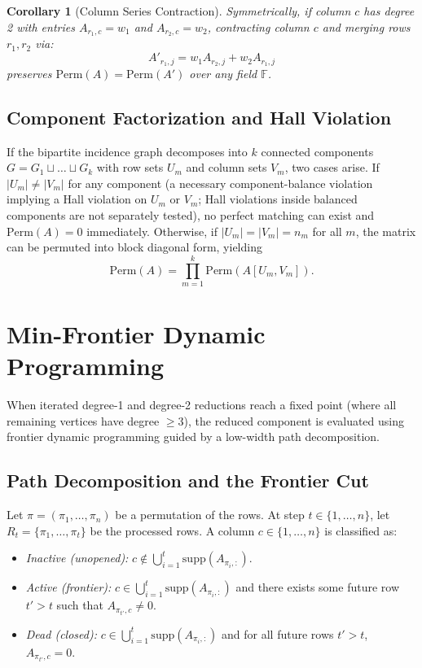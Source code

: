 \documentclass[11pt,a4paper]{article}
\newtheorem{corollary}[theorem]{Corollary}
\theoremstyle{definition}
\newcommand{\Perm}{\mathrm{Perm}}
\newcommand{\F}{\mathbb{F}}
\begin{document}
\begin{corollary}[Column Series Contraction]
Symmetrically, if column $c$ has degree 2 with entries $A_{r_1, c} = w_1$ and $A_{r_2, c} = w_2$, contracting column $c$ and merging rows $r_1, r_2$ via:
\begin{equation}
A'_{r_1, j} = w_1 A_{r_2, j} + w_2 A_{r_1, j}
\end{equation}
preserves $\Perm(A) = \Perm(A')$ over any field $\F$.
\end{corollary}

\subsection{Component Factorization and Hall Violation}

If the bipartite incidence graph decomposes into $k$ connected components $G = G_1 \sqcup \dots \sqcup G_k$ with row sets $U_m$ and column sets $V_m$, two cases arise. If $|U_m| \neq |V_m|$ for any component (a necessary component-balance violation implying a Hall violation on $U_m$ or $V_m$; Hall violations inside balanced components are not separately tested), no perfect matching can exist and $\Perm(A) = 0$ immediately. Otherwise, if $|U_m| = |V_m| = n_m$ for all $m$, the matrix can be permuted into block diagonal form, yielding
\begin{equation}
\Perm(A) = \prod_{m=1}^k \Perm(A[U_m, V_m]).
\end{equation}

\section{Min-Frontier Dynamic Programming}

When iterated degree-1 and degree-2 reductions reach a fixed point (where all remaining vertices have degree $\ge 3$), the reduced component is evaluated using frontier dynamic programming guided by a low-width path decomposition.

\subsection{Path Decomposition and the Frontier Cut}

Let $\pi = (\pi_1, \dots, \pi_n)$ be a permutation of the rows. At step $t \in \{1, \dots, n\}$, let $R_t = \{\pi_1, \dots, \pi_t\}$ be the processed rows. A column $c \in \{1, \dots, n\}$ is classified as:
\begin{itemize}[leftmargin=*]
    \item \emph{Inactive (unopened):} $c \notin \bigcup_{i=1}^t \mathrm{supp}(A_{\pi_i, :})$.
    \item \emph{Active (frontier):} $c \in \bigcup_{i=1}^t \mathrm{supp}(A_{\pi_i, :})$ and there exists some future row $t' > t$ such that $A_{\pi_{t'}, c} \neq 0$.
    \item \emph{Dead (closed):} $c \in \bigcup_{i=1}^t \mathrm{supp}(A_{\pi_i, :})$ and for all future rows $t' > t$, $A_{\pi_{t'}, c} = 0$.
\end{itemize}
\end{document}
